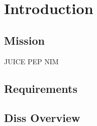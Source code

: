\section{Introduction}

	\subsection{Mission}
	JUICE PEP NIM
	
	\subsection{Requirements} %
	
	\subsection{Diss Overview} %